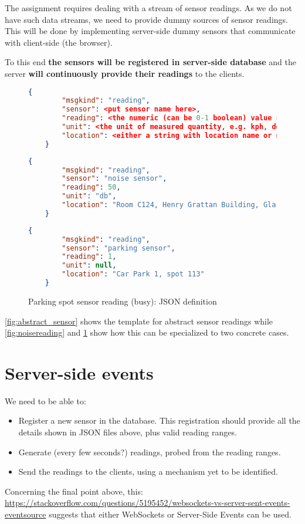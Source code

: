 The assignment requires dealing with a stream of sensor readings. As we do not have
such data streams, we need to provide dummy sources of sensor readings. This will 
be done by implementing server-side dummy sensors that communicate with client-side
(the browser). 

To this end {\bf the sensors will be registered in server-side database} and
the server {\bf will continuously provide their readings} to the clients.

\begin{figure}[h]
\begin{lstlisting}[language=json,firstnumber=1]
    {
        "msgkind": "reading",
        "sensor": <put sensor name here>,
        "reading": <the numeric (can be 0-1 boolean) value sent by the sensor>,
        "unit": <the unit of measured quantity, e.g. kph, decibels, or none>,
        "location": <either a string with location name or numeric coordinates>
    }
\end{lstlisting}
\caption{Abstract sensor reading: JSON definition}
\label{fig:abstract_sensor}
\vspace{4mm}
\begin{lstlisting}[language=json,firstnumber=1]
    {
        "msgkind": "reading",
        "sensor": "noise sensor",
        "reading": 50,
        "unit": "db",
        "location": "Room C124, Henry Grattan Building, Glasnevin Campus"
    }
\end{lstlisting}
\caption{Noise sensor reading: JSON definition}
\label{fig:noisereading}
\vspace{4mm}
\begin{lstlisting}[language=json,firstnumber=1]
    {
        "msgkind": "reading",
        "sensor": "parking sensor",
        "reading": 1,
        "unit": null,
        "location": "Car Park 1, spot 113" 
    }
\end{lstlisting}
\caption{Parking spot sensor reading (busy): JSON definition}
\label{fig:parkingspotreading}
\end{figure}

\cref{fig:abstract_sensor} shows the template for abstract sensor readings
while \cref{fig:noisereading} and \cref{fig:parkingspotreading} show how this
can be specialized to two concrete cases.

\section{Server-side events}

We need to be able to:
\begin{itemize}
    \item Register a new sensor in the database. This registration should provide all the details
    shown in JSON files above, plus valid reading ranges. 
    \item Generate (every few seconds?) readings, probed from the reading ranges.
    \item Send the readings to the clients, using a mechanism yet to be identified.
\end{itemize}

Concerning the final point above, this: \url{https://stackoverflow.com/questions/5195452/websockets-vs-server-sent-events-eventsource}
suggests that either WebSockets or Server-Side Events can be used.